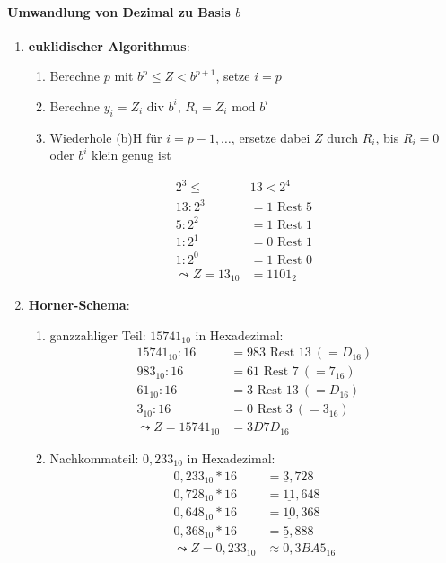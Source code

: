 \paragraph{Umwandlung von Dezimal zu Basis $b$}
\begin{enumerate}
	\item \textbf{euklidischer Algorithmus}:
	\begin{enumerate}
		\item Berechne $p$ mit $b^p \leq Z < b^{p+1}$, setze $i=p$
		\item Berechne $y_i=Z_i \text{ div } b^i$, $R_i = Z_i \text{ mod } b^i$
		\item Wiederhole (b)H für $i= p-1,\dots$, ersetze dabei $Z$ durch $R_i$, bis $R_i=0$ oder $b^i$ klein genug ist
	\end{enumerate}
	\begin{align*}
		2^3 \leq \ &13 < 2^4 \\
		13:2^3 &= 1 \text{ Rest } 5 \\
		5:2^2 &= 1 \text{ Rest } 1 \\
		1:2^1 &= 0 \text{ Rest } 1 \\
		1:2^0 &= 1 \text{ Rest } 0 \\
		\leadsto Z=13_{10} &= 1101_2
	\end{align*}

	\item \textbf{Horner-Schema}:
	\begin{enumerate}
	 	\item ganzzahliger Teil: $15741_{10}$ in Hexadezimal:
			\begin{align*}
				15741_{10}:16 &= 983 \text{ Rest } 13 \ (=D_{16}) \\
				983_{10}:16 &= 61 \text{ Rest } 7 \ (=7_{16}) \\
				61_{10}:16 &= 3 \text{ Rest } 13 \ (=D_{16}) \\
				3_{10}:16 &= 0 \text{ Rest } 3 \ (=3_{16}) \\
				\leadsto Z=15741_{10} &= 3D7D_{16}
			\end{align*}
		\item Nachkommateil: $0,233_{10}$ in Hexadezimal:
			\begin{align*}
				0,233_{10}*16 &= \underline{3},728 \\
				0,728_{10}*16 &= \underline{11},648 \\
				0,648_{10}*16 &= \underline{10},368 \\
				0,368_{10}*16 &= \underline{5},888 \\
				\leadsto Z=0,233_{10} &\approx 0,3BA5_{16}
			\end{align*}
	 \end{enumerate} 
\end{enumerate}

